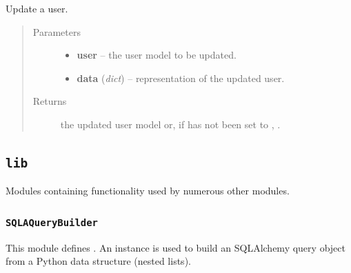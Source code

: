 \documentclass[letterpaper,10pt,english]{sphinxmanual}
\begin{document}

\begin{fulllineitems}
\label{api:onlinelinguisticdatabase.controllers.users.updateUser}
Update a user.
\begin{quote}\begin{description}
\item[{Parameters}] \leavevmode\begin{itemize}
\item {} 
\textbf{user} -- the user model to be updated.

\item {} 
\textbf{data} (\emph{dict}) -- representation of the updated user.

\end{itemize}

\item[{Returns}] \leavevmode
the updated user model or, if  has not been set
to , .

\end{description}\end{quote}

\end{fulllineitems}



\subsection{\texttt{lib}}
\label{api:module-onlinelinguisticdatabase.lib}\label{api:lib}
Modules containing functionality used by numerous other modules.
\label{api:module-lib}

\subsubsection{\texttt{SQLAQueryBuilder}}
\label{api:sqlaquerybuilder}\label{api:module-onlinelinguisticdatabase.lib.SQLAQueryBuilder}
This module defines {\hyperref[api:onlinelinguisticdatabase.lib.SQLAQueryBuilder.SQLAQueryBuilder]{}}.  An 
instance is used to build an SQLAlchemy query object from a Python data
structure (nested lists).
\end{document}
